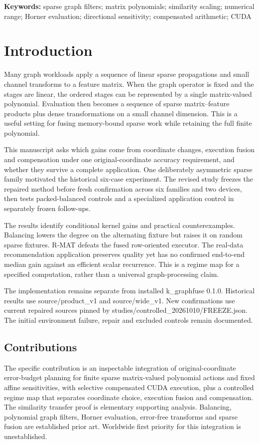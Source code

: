 \documentclass[10pt]{article}
\begin{document}
\noindent\textbf{Keywords:} sparse graph filters; matrix polynomials; similarity scaling; numerical range; Horner evaluation; directional sensitivity; compensated arithmetic; CUDA

\section{Introduction}

Many graph workloads apply a sequence of linear sparse propagations and small channel transforms to a feature matrix. When the graph operator is fixed and the stages are linear, the ordered stages can be represented by a single matrix-valued polynomial. Evaluation then becomes a sequence of sparse matrix--feature products plus dense transformations on a small channel dimension. This is a useful setting for fusing memory-bound sparse work while retaining the full finite polynomial.

This manuscript asks which gains come from coordinate changes, execution fusion and compensation under one original-coordinate accuracy requirement, and whether they survive a complete application. One deliberately asymmetric sparse family motivated the historical six-case experiment. The revised study freezes the repaired method before fresh confirmation across six families and two devices, then tests packed-balanced controls and a specialized application control in separately frozen follow-ups.

The results identify conditional kernel gains and practical counterexamples. Balancing lowers the degree on the alternating fixture but raises it on random sparse fixtures. R-MAT defeats the fused row-oriented executor. The real-data recommendation application preserves quality yet has no confirmed end-to-end median gain against an efficient scalar recurrence. This is a regime map for a specified computation, rather than a universal graph-processing claim.

The implementation remains separate from installed k\_graphfuse 0.1.0. Historical results use source/product\_v1 and source/wide\_v1. New confirmations use current repaired sources pinned by studies/controlled\_20261010/FREEZE.json. The initial environment failure, repair and excluded controls remain documented.


\subsection{Contributions}
The specific contribution is an inspectable integration of original-coordinate error-budget planning for finite sparse matrix-valued polynomial actions and fixed affine sensitivities, with selective compensated CUDA execution, plus a controlled regime map that separates coordinate choice, execution fusion and compensation. The similarity transfer proof is elementary supporting analysis. Balancing, polynomial graph filters, Horner evaluation, error-free transforms and sparse fusion are established prior art. Worldwide first priority for this integration is unestablished.
\end{document}
